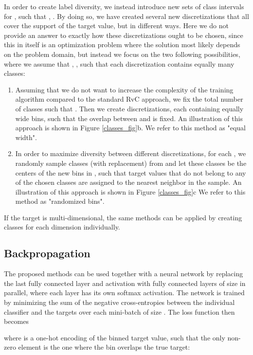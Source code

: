 \documentclass[10pt, conference, a4paper]{IEEEtran}
\begin{document}
In order to create label diversity, we instead introduce  new sets of class intervals  for , such that , . By doing so, we have created several new discretizations that all cover the support of the target value, but in different ways. Here we do not provide an answer to exactly how these discretizations ought to be chosen, since this in itself is an optimization problem where the solution most likely depends on the problem domain, but instead we focus on the two following possibilities, where we assume that , , such that each discretization contains equally many classes:
\begin{enumerate}

\item Assuming that we do not want to increase the complexity of the training algorithm compared to the standard RvC approach, we fix the total number of classes such that . Then we create  discretizations, each containing  equally wide bins, such that the overlap between  and  is fixed. An illustration of this approach is shown in Figure \ref{classes_fig}b. We refer to this method as "equal width".
\item In order to maximize diversity between different discretizations, for each , we randomly sample  classes (with replacement) from  and let these classes be the centers of the new bins in , such that target values that do not belong to any of the chosen classes are assigned to the nearest neighbor in the sample. An illustration of this approach is shown in Figure \ref{classes_fig}c We refer to this method as "randomized bins".
\end{enumerate}

If the target is multi-dimensional, the same methods can be applied by creating classes for each dimension individually. 

\subsection{Backpropagation}
The proposed methods can be used together with a neural network by replacing the last fully connected layer and activation with  fully connected layers of size  in parallel, where each layer has its own softmax activation. The network is trained by minimizing the sum of the negative cross-entropies between the individual classifier and the targets over each mini-batch of size . The loss function then becomes

where  is a one-hot encoding of the binned target value, such that the only non-zero element is the one where the bin overlaps the true target:
\end{document}

